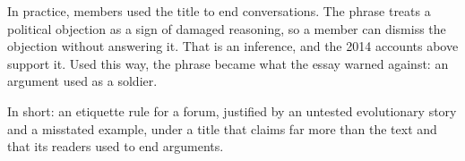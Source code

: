 \begin{afterword}
In practice, members used the title to end conversations. The phrase treats a political objection as a sign of damaged reasoning, so a member can dismiss the objection without answering it. That is an inference, and the 2014 accounts above support it. Used this way, the phrase became what the essay warned against: an argument used as a soldier.

In short: an etiquette rule for a forum, justified by an untested evolutionary story and a misstated example, under a title that claims far more than the text and that its readers used to end arguments.
\end{afterword}
